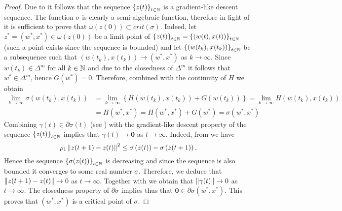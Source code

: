 \begin{proof}
Due to  it follows that the sequence $\left\lbrace z(t) \right\rbrace_{t \in \mathbb{N}}$ is a gradient-like descent sequence. The function $\sigma$ is clearly a semi-algebraic function, therefore in light of  it is sufficient to prove that $\omega(z(0)) \subset crit(\sigma)$. 
Indeed, let $z^*=\left( w^*,x^* \right) \in \omega(z(0))$ be a limit point of  $\left\lbrace z(t) \right\rbrace_{t \in \mathbb{N}} = \left\lbrace \left( w(t),x(t) \right) \right\rbrace_{t \in \mathbb{N}}$ (such a point exists since the sequence is bounded) and let $\left\lbrace \left( w(t_k),x(t_k) \right) \right\rbrace_{t \in \mathbb{N}}$ be a subsequence such that $\left( w(t_k),x(t_k) \right) \rightarrow \left( w^*,x^* \right)$ as $k \rightarrow \infty$. Since $w(t_k) \in \Delta^m$ for all $k \in \mathbb{N}$ and due to the closedness of $\Delta^m$ it follows that $w^* \in \Delta^m$, hence $G(w^*)=0$. Therefore, combined with the continuity of $H$ we obtain
\begin{align*}
\lim\limits_{k \rightarrow \infty} \sigma\left( w(t_k),x(t_k) \right) &= \lim\limits_{k \rightarrow \infty} \left\lbrace H\left(w(t_k),x(t_k)\right) + G\left(w(t_k)\right) \right\rbrace = \lim\limits_{k \rightarrow \infty} H\left(w(t_k),x(t_k)\right) \\
&= H\left(w^*,x^* \right) = H\left(w^*,x^* \right) + G(w^*) = \sigma\left(w^*,x^*\right)
\end{align*}
Combining $\gamma(t) \in \partial \sigma(t)$ (see ) with the gradient-like descent property of the sequence $\left\lbrace z(t) \right\rbrace_{t \in \mathbb{N}}$ implies that $\gamma(t) \rightarrow \mathbf{0}$ as $t \rightarrow \infty$.
Indeed, from  we have
\begin{equation*}
	\rho_1 \left\Vert {z(t+1)-z(t)} \right\Vert^2 \leq \sigma\left(z(t)\right) - \sigma\left(z(t+1)\right).
\end{equation*}
Hence the sequence $\left\lbrace \sigma(z(t))\right\rbrace_{t \in \mathbb{N}}$ is decreasing and since the sequence is also bounded it converges to some real number $\underline{\sigma}$. Therefore, we deduce that $\left\Vert {z(t+1)-z(t)} \right\Vert \rightarrow 0$ as $t \rightarrow \infty$. Together with  we obtain that $\left\Vert {\gamma(t)} \right\Vert \rightarrow 0$ as $t \rightarrow \infty$.
The closedness property of $\partial\sigma$ implies thus that $\mathbf{0} \in \partial \sigma \left(w^*,x^*\right)$. This proves that $\left(w^*,x^*\right)$ is a critical point of $\sigma$.
\end{proof}

